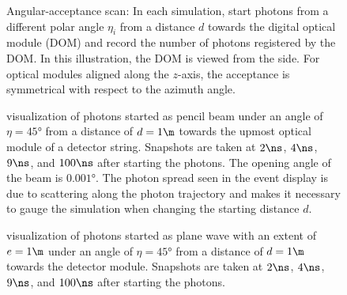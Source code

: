 \begin{figure}[htbp]
  \hfill
  \caption{Angular-acceptance scan: In each simulation, start photons from a different polar angle $\eta_i$ from a distance $d$ towards the digital optical module (DOM) and record the number of photons registered by the DOM. In this illustration, the DOM is viewed from the side. For optical modules aligned along the $z$-axis, the acceptance is symmetrical with respect to the azimuth angle.}
  \label{fig:quie8Oof}
\end{figure}

\begin{figure}[htbp]
  \hfill
  \hfill
  \hfill
  \caption{\steamshovel visualization of photons started as pencil beam under an angle of $\eta = \ang{45}$ from a distance of $d = 1\m$ towards the upmost optical module of a detector string. Snapshots are taken at $2\ns$, $4\ns$, $9\ns$, and $100\ns$ after starting the photons. The opening angle of the beam is $\ang{0.001}$. The photon spread seen in the event display is due to scattering along the photon trajectory and makes it necessary to gauge the simulation when changing the starting distance $d$.}
  \label{fig:Paihah7h}
\end{figure}

\begin{figure}[htbp]
  \hfill
  \hfill
  \hfill
  \caption{\steamshovel visualization of photons started as plane wave with an extent of $e = 1\m$ under an angle of $\eta = \ang{45}$ from a distance of $d = 1\m$ towards the detector module. Snapshots are taken at $2\ns$, $4\ns$, $9\ns$, and $100\ns$ after starting the photons.}
  \label{fig:Aehi7kae}
\end{figure}


